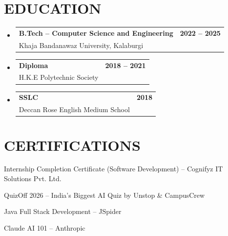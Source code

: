 \documentclass[letterpaper,11pt]{article}
\makeatletter
\newcommand{\resumeSubheading}[4]{
  \vspace{2pt}\item
    \begin{tabular*}{1.0\textwidth}[t]{l@{\extracolsep{\fill}}r}
      \textbf{\normalsize #1} & \textbf{\normalsize #2} \\
      \normalsize#3 & \normalsize #4 \\
    \end{tabular*}\vspace{0pt}
}
\newcommand{\resumeSubHeadingListStart}{\begin{itemize}[leftmargin=0.0in, label={}, topsep=1pt, itemsep=1pt, parsep=0pt]}
\newcommand{\resumeSubHeadingListEnd}{\end{itemize}\vspace{-4pt}}
\makeatother
\begin{document}
\vspace{1pt}
\section{EDUCATION}
\resumeSubHeadingListStart
  \resumeSubheading
    {B.Tech -- Computer Science and Engineering}{2022 -- 2025}
    {Khaja Bandanawaz University, Kalaburgi}{}
    \vspace{-3pt}
  \resumeSubheading
    {Diploma}{2018 -- 2021}
    {H.K.E Polytechnic Society}{}
    \vspace{-3pt}
  \resumeSubheading
    {SSLC}{2018}
    {Deccan Rose English Medium School}{}
\resumeSubHeadingListEnd

\vspace{-2pt}
\section{CERTIFICATIONS}
\vspace{1pt}
\begin{itemize}[topsep=0pt, itemsep=2pt, parsep=0pt, leftmargin=0.15in]
  \normalsize{
  \item Internship Completion Certificate (Software Development) -- Cognifyz IT Solutions Pvt. Ltd.
  \item QuizOff 2026 -- India's Biggest AI Quiz by Unstop \& CampusCrew
  \item Java Full Stack Development -- JSpider
  \item Claude AI 101 -- Anthropic
  }
\end{itemize}
\end{document}
